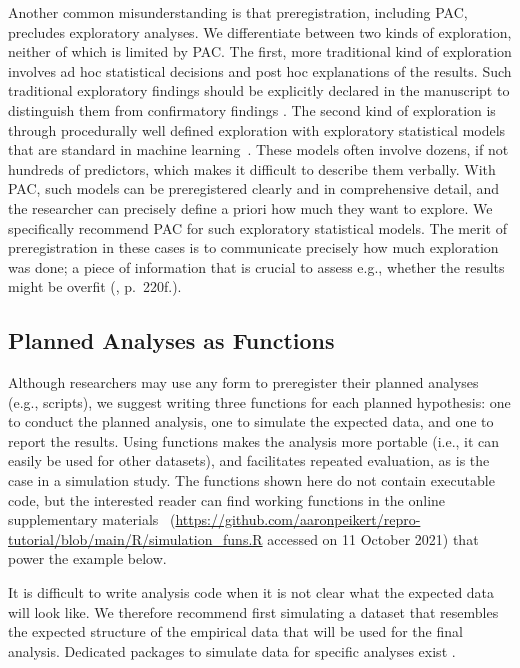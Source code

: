 \documentclass[psych,tutorial,accept,moreauthors,pdftex]{Definitions/mdpi}
\begin{document}
\begin{paracol}{2}
Another common misunderstanding is that preregistration, including PAC,
precludes exploratory analyses. We differentiate between two kinds of
exploration, neither of which is limited by PAC. The first, more
traditional kind of exploration involves ad hoc statistical decisions
and post hoc explanations of the results. Such traditional exploratory
findings should be explicitly declared in the manuscript to distinguish
them from confirmatory findings
\citep{NosekRevolution2018, nosekPreregistrationHardWorthwhile2019}. The
second kind of exploration is through procedurally well defined
exploration with exploratory statistical models that are standard in
machine learning~\citep{brandmaier22mlsem}. These models often involve
dozens, if not hundreds of predictors, which makes it difficult to
describe them verbally. With PAC, such models can be preregistered
clearly and in comprehensive detail, and the researcher can precisely define
a priori how much they want to explore. We specifically recommend PAC
for such exploratory statistical models. The merit of preregistration in
these cases is to communicate precisely how much exploration was done; a
piece of information that is crucial to assess e.g., whether the results
might be overfit
(\citep{hastieElementsStatisticalLearning2017}, p.~220f.).

\subsection{Planned Analyses as
Functions}\label{planned-analyses-as-functions}

Although researchers may use any form to preregister their planned
analyses (e.g., scripts), we suggest writing three functions for each
planned hypothesis: one to conduct the planned analysis, one to simulate
the expected data, and one to report the results. Using functions makes the
analysis more portable (i.e., it can easily be used for other datasets),
and facilitates repeated evaluation, as is the case in a simulation
study. The functions shown here do not contain executable code, but the
interested reader can find working functions in the {online
supplementary materials}
~(\url{https://github.com/aaronpeikert/repro-tutorial/blob/main/R/simulation_funs.R} accessed on 11 October 2021) that power the example below.

It is difficult to write analysis code when it is not clear what the
expected data will look like. We therefore recommend first simulating a
dataset that resembles the expected structure of the empirical data that
will be used for the final analysis. Dedicated packages to simulate data
for specific analyses exist .


\end{paracol}
\end{document}
